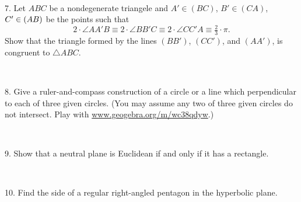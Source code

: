\documentclass[oneside,a4paper]{article}
\def\noi{\noindent}
\begin{document}
\ 

\noi %
{7.} Let $ABC$ be a nondegenerate triangele and $A'\in (BC)$, $B'\in (CA)$, $C'\z\in (AB)$ be the points such that 
\[2\cdot \angle AA'B\equiv 2\cdot \angle BB'C\equiv 2\cdot \angle CC'A\equiv \tfrac23{\cdot}\pi.\]
Show that the triangle formed by the lines $(BB')$, $(CC')$, and $(AA')$, is congruent to  $\triangle ABC$.

\

\noi %
{8.} Give a ruler-and-compass construction of a circle or a line which perpendicular to each of three given circles.
(You may assume any two of three given circles do not intersect. Play with \href{https://www.geogebra.org/m/wc38qdyw}{www.geogebra.org/m/wc38qdyw}.)

\

\noi %
{9.} %
Show that a neutral plane is Euclidean if and only if it has a rectangle.



\

\noi %
{10.} Find the side of a regular right-angled pentagon in the hyperbolic plane.
\end{document}

